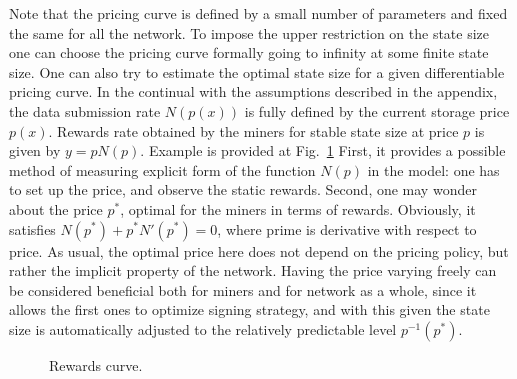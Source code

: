 \documentclass[]{llncs}   %
\begin{document}
Note that the pricing curve is defined by a small number of parameters and
fixed the same for all the network. To impose the upper restriction on the state
size one can choose the pricing curve formally going to infinity at some finite
state size. One can also try to estimate the optimal state size for a given
differentiable pricing curve. In the continual with the assumptions
described in the appendix, the data submission rate $N(p(x))$ is fully defined by the
current storage price $p(x)$.  Rewards rate obtained by the miners for stable
state size at price $p$ is given by $y=pN(p)$. Example is provided at
Fig.~\ref{fig:rewards} First, it provides a possible method of measuring
explicit form of the function $N(p)$ in the model: one has to set up the price,
and observe the static rewards. Second, one may wonder about the price $p^*$,
optimal for the miners in terms of rewards. Obviously, it satisfies
$N(p^*)+p^*N'(p^*)=0$, where prime is derivative with respect to price. As
usual, the optimal price here does not depend on the pricing policy, but rather
the implicit property of the network.  Having the price varying freely can be
considered beneficial both for miners and for network as a whole, since it
allows the first ones to optimize signing strategy, and with this given the
state size is automatically adjusted to the relatively predictable level
$p^{-1}(p^*)$.

\begin{figure}
    
    \caption{
        \label{fig:rewards} Rewards curve.
    }
\end{figure}
\end{document}
